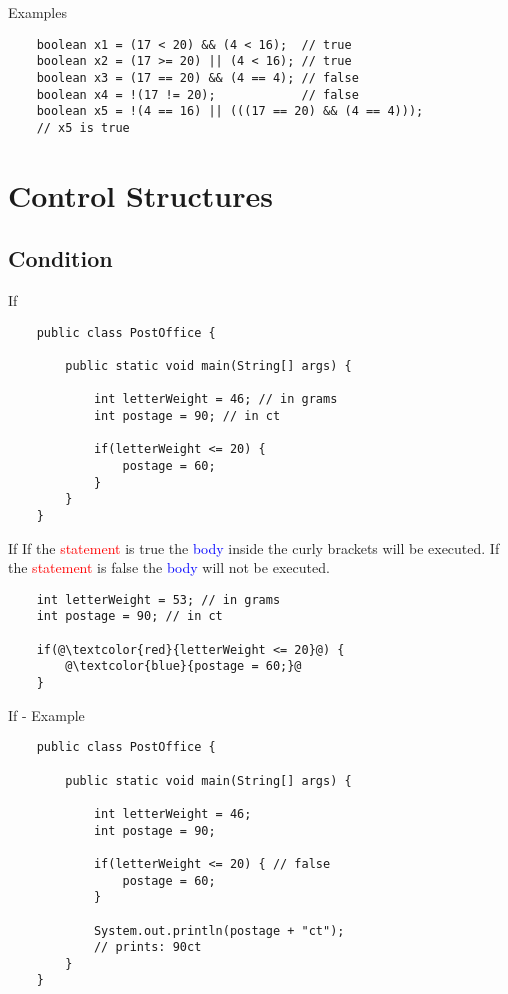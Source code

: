 \begin{frame}[fragile]{Examples}
	\begin{lstlisting}
	boolean x1 = (17 < 20) && (4 < 16);  // true
	boolean x2 = (17 >= 20) || (4 < 16); // true
	boolean x3 = (17 == 20) && (4 == 4); // false
	boolean x4 = !(17 != 20);            // false
	boolean x5 = !(4 == 16) || (((17 == 20) && (4 == 4))); 
	// x5 is true
	\end{lstlisting}
\end{frame}

\section{Control Structures}
\subsection{Condition}
\begin{frame}[fragile]{If}
	\begin{lstlisting}
	public class PostOffice {
	
	    public static void main(String[] args) {
	
	        int letterWeight = 46; // in grams
	        int postage = 90; // in ct
	    
	        if(letterWeight <= 20) {
	            postage = 60;
	        }
	    }
	}
	\end{lstlisting}
\end{frame}

\begin{frame}[fragile]{If}
	If the \textcolor{red}{statement} is true the \textcolor{blue}{body} inside the curly brackets will be executed.
	If the \textcolor{red}{statement} is false the \textcolor{blue}{body} will not be executed.
	\begin{lstlisting}
	int letterWeight = 53; // in grams
	int postage = 90; // in ct
	    
	if(@\textcolor{red}{letterWeight <= 20}@) {
	    @\textcolor{blue}{postage = 60;}@
	}
	\end{lstlisting}
\end{frame}

\begin{frame}[fragile]{If - Example}
	\begin{lstlisting}
	public class PostOffice {
	
	    public static void main(String[] args) {
	
	        int letterWeight = 46;
	        int postage = 90;
	        
	        if(letterWeight <= 20) { // false
	            postage = 60;
	        }
	        
	        System.out.println(postage + "ct");
	        // prints: 90ct
	    }
	}
	\end{lstlisting}
\end{frame}

